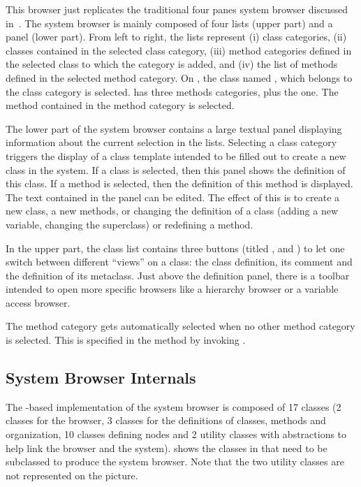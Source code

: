 \documentclass[a4paper,10pt,twoside]{book}
\begin{document}
This browser just replicates the traditional four panes system browser discussed in~.
The system browser is mainly composed of four lists (upper part) and a panel (lower part). From left to right, the lists represent (i) class categories, (ii) classes contained in the selected class category, (iii) method categories defined in the selected class to which the  category is added, and (iv) the list of methods defined in the selected method category. On , the class named , which belongs to the class category  is selected.  has three methods categories, plus the  one. The method  contained in the  method category is selected.

The lower part of the system browser contains a large textual panel displaying information about the current selection in the lists. Selecting a class category triggers the display of a class template intended to be filled out to create a new class in the system. If a class is selected, then this panel shows the definition of this class. If a method is selected, then the definition of this method is displayed. The text contained in the panel can be edited. The effect of this is to create a new class, a new methods, or changing the definition of a class (\eg adding a new variable, changing the superclass) or redefining a method.

In the upper part, the class list contains three buttons (titled ,  and ) to let one switch between different ``views'' on a class: the class definition, its comment and the definition of its metaclass. Just above the definition panel, there is a toolbar intended to open more specific browsers like a hierarchy browser or a variable access browser.

The  method category gets automatically selected when no other method category is selected. This is specified in the  method by invoking .


\subsection{System Browser Internals}
The \ob-based implementation of the \pharo system browser is composed of 17 classes (2 classes for the browser, 3 classes for the definitions of classes, methods and organization, 10 classes defining nodes and 2 utility classes with abstractions to help link the browser and the system).  shows the classes in \obf that need to be subclassed to produce the system browser. Note that the two utility classes are not represented on the picture.
\end{document}
